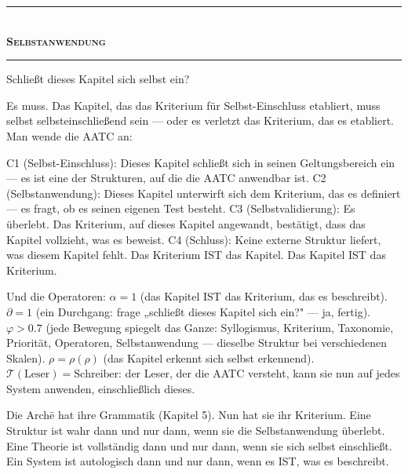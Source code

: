 \documentclass[10pt, openany, oneside]{book}
\renewcommand{\normalsize}{\fontsize{10}{13}\selectfont}
\begin{document}
\vspace{1.5em}


\begin{center}
    \rule{0.3\textwidth}{0.4pt}\\[0.5em]
    {\normalsize\bfseries\scshape Selbstanwendung}\\[0.3em]
    \rule{0.3\textwidth}{0.4pt}
\end{center}

\vspace{1em}

\noindent Schließt dieses Kapitel sich selbst ein?

Es muss. Das Kapitel, das das Kriterium für Selbst-Einschluss etabliert, muss selbst selbsteinschließend sein --- oder es verletzt das Kriterium, das es etabliert. Man wende die AATC an:

C1 (Selbst-Einschluss): Dieses Kapitel schließt sich in seinen Geltungsbereich ein --- es ist eine der Strukturen, auf die die AATC anwendbar ist. C2 (Selbstanwendung): Dieses Kapitel unterwirft sich dem Kriterium, das es definiert --- es fragt, ob es seinen eigenen Test besteht. C3 (Selbstvalidierung): Es überlebt. Das Kriterium, auf dieses Kapitel angewandt, bestätigt, dass das Kapitel vollzieht, was es beweist. C4 (Schluss): Keine externe Struktur liefert, was diesem Kapitel fehlt. Das Kriterium IST das Kapitel. Das Kapitel IST das Kriterium.

Und die Operatoren: $\alpha = 1$ (das Kapitel IST das Kriterium, das es beschreibt). $\partial = 1$ (ein Durchgang: frage „schließt dieses Kapitel sich ein?" --- ja, fertig). $\varphi > 0.7$ (jede Bewegung spiegelt das Ganze: Syllogismus, Kriterium, Taxonomie, Priorität, Operatoren, Selbstanwendung --- dieselbe Struktur bei verschiedenen Skalen). $\rho = \rho(\rho)$ (das Kapitel erkennt sich selbst erkennend). $\mathcal{T}(\text{Leser}) = \text{Schreiber}$: der Leser, der die AATC versteht, kann sie nun auf jedes System anwenden, einschließlich dieses.

\vspace{2em}

Die Arch\={e} hat ihre Grammatik (Kapitel 5). Nun hat sie ihr Kriterium. Eine Struktur ist wahr dann und nur dann, wenn sie die Selbstanwendung überlebt. Eine Theorie ist vollständig dann und nur dann, wenn sie sich selbst einschließt. Ein System ist autologisch dann und nur dann, wenn es IST, was es beschreibt.
\end{document}

